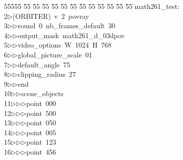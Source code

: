 %
%
\begin{tabbing}
55555 \= 55 \= 55 \= 55 \= 55 \= 55 \= 55 \= 55 \= 55 \= 55 \= 55 \= 55 \= 55 \= \>math261\_test:\\[0pt]
2\>$\triangleright$\>(ORBITER)\ v\ 2\ povray\ \\[0pt]
3\>$\triangleright$\>$\triangleright$\>round\ 0\ nb\_frames\_default\ 30\ \\[0pt]
4\>$\triangleright$\>$\triangleright$\>output\_mask\ math261\_d\_03dpov\ \\[0pt]
5\>$\triangleright$\>$\triangleright$\>video\_options\ W\ 1024\ H\ 768\ \\[0pt]
6\>$\triangleright$\>$\triangleright$\>global\_picture\_scale\ 01\ \\[0pt]
7\>$\triangleright$\>$\triangleright$\>default\_angle\ 75\ \\[0pt]
8\>$\triangleright$\>$\triangleright$\>clipping\_radius\ 27\ \\[0pt]
9\>$\triangleright$\>$\triangleright$\>end\ \\[0pt]
10\>$\triangleright$\>$\triangleright$\>scene\_objects\ \\[0pt]
11\>$\triangleright$\>$\triangleright$\>$\triangleright$\>point\ 000\ \\[0pt]
12\>$\triangleright$\>$\triangleright$\>$\triangleright$\>point\ 500\ \\[0pt]
13\>$\triangleright$\>$\triangleright$\>$\triangleright$\>point\ 050\ \\[0pt]
14\>$\triangleright$\>$\triangleright$\>$\triangleright$\>point\ 005\ \\[0pt]
15\>$\triangleright$\>$\triangleright$\>$\triangleright$\>point\ 123\ \\[0pt]
16\>$\triangleright$\>$\triangleright$\>$\triangleright$\>point\ 456\ \\[0pt]

\end{tabbing}

